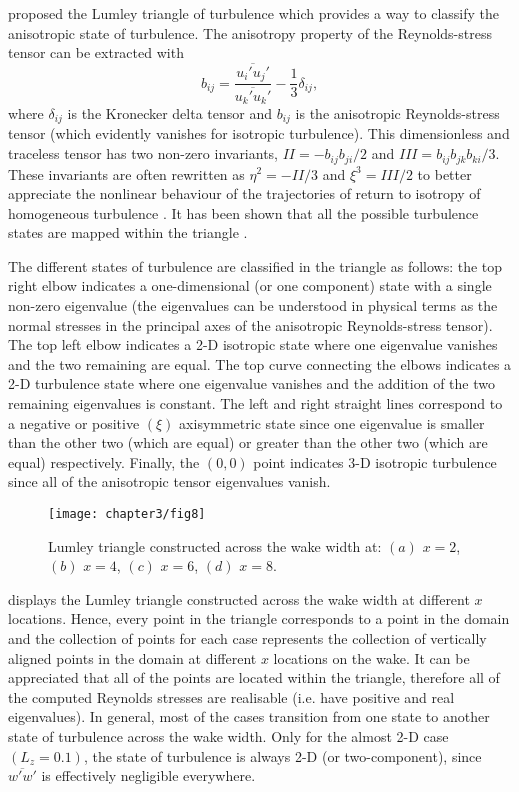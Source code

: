 \documentclass[../main.tex]{subfiles}
\begin{document}
\cite{Lumley1977} proposed the Lumley triangle of turbulence which provides a way to classify the anisotropic state of turbulence.
The anisotropy property of the Reynolds-stress tensor can be extracted with
\begin{equation}
b_{ij} = \frac{\overline{u_i' u_j'}}{\overline{u_k' u_k'}} - \frac{1}{3}\delta_{ij},
\end{equation}
where $\delta_{ij}$ is the Kronecker delta tensor and $b_{ij}$ is the anisotropic Reynolds-stress tensor (which evidently vanishes for isotropic turbulence).
This dimensionless and traceless tensor has two non-zero invariants, $II=-b_{ij}b_{ji}/2$ and $III=b_{ij}b_{jk}b_{ki}/3$.
These invariants are often rewritten as $\eta^2=-II/3$ and $\xi^3=III/2$ to better appreciate the nonlinear behaviour of the trajectories of return to isotropy of homogeneous turbulence \citep{Choi2001}.
It has been shown that all the possible turbulence states are mapped within the triangle \citep{Lumley1977, Lumley1979}.

The different states of turbulence are classified in the triangle as follows: the top right elbow indicates a one-dimensional (or one component) state with a single non-zero eigenvalue (the eigenvalues can be understood in physical terms as the normal stresses in the principal axes of the anisotropic Reynolds-stress tensor).
The top left elbow indicates a 2-D isotropic state where one eigenvalue vanishes and the two remaining are equal.
The top curve connecting the elbows indicates a 2-D turbulence state where one eigenvalue vanishes and the addition of the two remaining eigenvalues is constant.
The left and right straight lines correspond to a negative or positive $\left( \xi \right)$ axisymmetric state since one eigenvalue is smaller than the other two (which are equal) or greater than the other two (which are equal) respectively.
Finally, the $(0,0)$ point indicates 3-D isotropic turbulence since all of the anisotropic tensor eigenvalues vanish.

\begin{figure}
	\vspace*{0.3cm}
  \centerline{\texttt{[image: chapter3/fig8]}}
  \caption{Lumley triangle constructed across the wake width at: $(a)$ $x=2$, $(b)$ $x=4$, $(c)$ $x=6$, $(d)$ $x=8$.}
\label{fig:lumleys_triangle}
\end{figure}

 displays the Lumley triangle constructed across the wake width at different $x$ locations.
Hence, every point in the triangle corresponds to a point in the domain and the collection of points for each case represents the collection of vertically aligned points in the domain at different $x$ locations on the wake.
It can be appreciated that all of the points are located within the triangle, therefore all of the computed Reynolds stresses are realisable (i.e. have positive and real eigenvalues).
In general, most of the cases transition from one state to another state of turbulence across the wake width.
Only for the almost 2-D case $\left(L_z=0.1\right)$, the state of turbulence is always 2-D (or two-component), since $\overline{w'w'}$ is effectively negligible everywhere.
\end{document}
